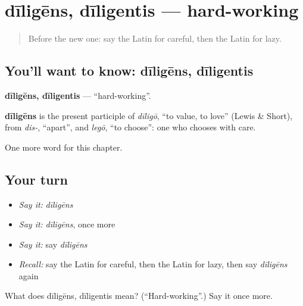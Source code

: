 \section[dīligēns, dīligentis]{dīligēns, dīligentis — hard-working}

\label{lesson:LA-C150-diligens}



\begin{quote}
Before the new one: say the Latin for careful, then the Latin for lazy.
\end{quote}

\subsection*{You'll want to know: dīligēns, dīligentis}
\textbf{dīligēns, dīligentis} — \textquotedblleft{}hard-working\textquotedblright{}.

\begin{cousinweb}
\textbf{dīligēns} is the present participle of \emph{dīligō}, \textquotedblleft{}to value, to love\textquotedblright{} (Lewis \& Short), from \emph{dis-}, \textquotedblleft{}apart\textquotedblright{}, and \emph{legō}, \textquotedblleft{}to choose\textquotedblright{}: one who chooses with care.
\end{cousinweb}

\begin{grammarlens}[title={What you've built}]
One more word for this chapter.
\end{grammarlens}

\subsection*{Your turn}
\begin{itemize}
\raggedright
  \item \emph{Say it:} \emph{dīligēns}
  \item \emph{Say it:} \emph{dīligēns}, once more
  \item \emph{Say it:} say \emph{dīligēns}
  \item \emph{Recall:} say the Latin for careful, then the Latin for lazy, then say \emph{dīligēns} again
\end{itemize}

\begin{tcolorbox}[breakable,colback=teal!4,colframe=teal!35!black,title={Before you move on}]
What does dīligēns, dīligentis mean? (\textquotedblleft{}Hard-working\textquotedblright{}.) Say it once more.
\end{tcolorbox}
